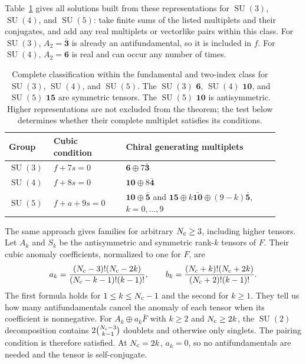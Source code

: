 \documentclass[11pt,a4paper]{article}
\theoremstyle{remark}
\DeclareMathOperator{\SU}{SU}
\begin{document}
Table~\ref{tab:small-rank-tensors} gives all solutions built from these
representations for $\SU(3)$, $\SU(4)$, and $\SU(5)$: take finite sums
of the listed multiplets and their conjugates, and add any real
multiplets or vectorlike pairs within this class. For $\SU(3)$,
$A_2=\bar{\mathbf3}$ is already an antifundamental, so it is included
in $f$. For $\SU(4)$, $A_2=\mathbf6$ is real and can occur any number
of times.

\begin{table}[htbp]
\centering
\renewcommand{\arraystretch}{1.2}
\begin{tabular}{p{0.13\linewidth}p{0.25\linewidth}p{0.53\linewidth}}
\hline
Group & Cubic condition & Chiral generating multiplets \\
\hline
$\SU(3)$ & $f+7s=0$ & $\mathbf6\oplus7\bar{\mathbf3}$ \\
$\SU(4)$ & $f+8s=0$ & $\mathbf{10}\oplus8\bar{\mathbf4}$ \\
$\SU(5)$ & $f+a+9s=0$ & $\mathbf{10}\oplus\bar{\mathbf5}$ and
$\mathbf{15}\oplus k\bar{\mathbf{10}}\oplus(9-k)\bar{\mathbf5}$,
$k=0,\ldots,9$ \\
\hline
\end{tabular}
\caption{Complete classification within the fundamental and two-index
class for $\SU(3)$, $\SU(4)$, and $\SU(5)$. The
$\SU(3)$ $\mathbf6$, $\SU(4)$ $\mathbf{10}$, and $\SU(5)$
$\mathbf{15}$ are symmetric tensors. The
$\SU(5)$ $\mathbf{10}$ is antisymmetric. Higher representations are
not excluded from the theorem; the test below determines whether their
complete multiplet satisfies its conditions.}
\label{tab:small-rank-tensors}
\end{table}

The same approach gives families for arbitrary $N_{\rm c}\ge3$,
including higher tensors. Let $A_k$ and $S_k$ be the antisymmetric and
symmetric rank-$k$ tensors of $F$. Their cubic anomaly coefficients,
normalized to one for $F$, are~\cite[appendix~B]{ShiShrock2015}
\begin{equation}
 a_k=\frac{(N_{\rm c}-3)!(N_{\rm c}-2k)}
 {(N_{\rm c}-k-1)!(k-1)!},\qquad
 b_k=\frac{(N_{\rm c}+k)!(N_{\rm c}+2k)}
 {(N_{\rm c}+2)!(k-1)!}.
\end{equation}
The first formula holds for $1\le k\le N_{\rm c}-1$ and the second
for $k\ge1$. They tell us how many antifundamentals cancel the anomaly
of each tensor when its coefficient is nonnegative. For
$A_k\oplus a_k\bar F$ with $k\ge2$ and $N_{\rm c}\ge2k$,
the $\SU(2)$ decomposition contains
$2\binom{N_{\rm c}-3}{k-1}$ doublets and otherwise only singlets.
The pairing condition is therefore satisfied. At $N_{\rm c}=2k$,
$a_k=0$, so no antifundamentals are needed and the tensor is
self-conjugate.
\end{document}
